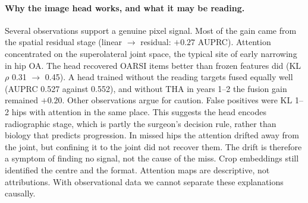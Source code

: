 \begin{table}[!tbp]
  \centering
  \caption{\textbf{Image-only performance.} Same conventions as Table~\ref{tab:main}.
  \textsuperscript{\dag}Different endpoint (shown for scale only).}
  \label{tab:image}
  \small
  \setlength{\tabcolsep}{3.5pt}
\end{table}

\paragraph{Why the image head works, and what it may be reading.}
Several observations support a genuine pixel signal. Most of the gain came from the spatial residual stage (linear
$\to$ residual: $+0.27$ AUPRC). Attention concentrated on the superolateral joint space, the typical site of early
narrowing in hip OA. The head recovered OARSI items better than frozen features did (KL $\rho$ 0.31 $\to$ 0.45). A head
trained without the reading targets fused equally well (AUPRC 0.527 against 0.552), and without THA in years 1--2 the
fusion gain remained $+0.20$. Other observations argue for caution. False positives were KL 1--2 hips with attention in
the same place. This suggests the head encodes radiographic stage, which is partly the surgeon's decision rule, rather
than biology that predicts progression. In missed hips the attention drifted away from the joint, but confining it to
the joint did not recover them. The drift is therefore a symptom of finding no signal, not the cause of the miss.
Crop embeddings still identified the centre and the format. Attention maps are descriptive, not attributions. With observational data we cannot separate these explanations causally.

